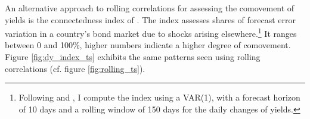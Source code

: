 

An alternative approach to rolling correlations for assessing the comovement of yields is the connectedness index of \cite{DieboldYilmaz:2014}. 
The index assesses shares of forecast error variation in a country's bond market due to shocks arising elsewhere.\footnote{ Following \cite{ACDM:2019} and \cite{BostanciYilmaz:2020}, I compute the index  using a VAR(1), with a forecast horizon of 10 days and a rolling window of 150 days for the daily changes of yields.} %
It ranges between 0 and 100\%, higher numbers indicate a higher degree of comovement. 
Figure \ref{fig:dy_index_ts} exhibits the same patterns seen using rolling correlations (cf. figure \ref{fig:rolling_ts}).


